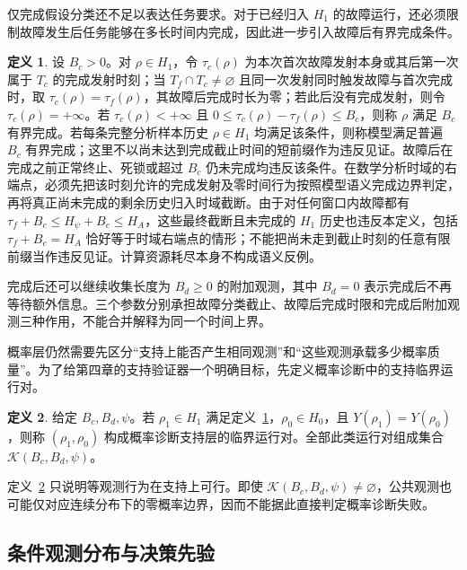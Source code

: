 \documentclass[master,fontset=ubuntu]{shnuthesis}
\theoremstyle{definition}
\newtheorem{thesisdefinition}{定义}
\begin{document}
仅完成假设分类还不足以表达任务要求。对于已经归入 \(H_1\) 的故障运行，还必须限制故障发生后任务能够在多长时间内完成，因此进一步引入故障后有界完成条件。

\begin{thesisdefinition}
\label{def:bounded-postfault-completion}
设 \(B_c>0\)。对 \(\rho\in H_1\)，令 \(\tau_c(\rho)\) 为本次首次故障发射本身或其后第一次属于 \(T_c\) 的完成发射时刻；当 \(T_f\cap T_c\neq\varnothing\) 且同一次发射同时触发故障与首次完成时，取 \(\tau_c(\rho)=\tau_f(\rho)\)，其故障后完成时长为零；若此后没有完成发射，则令 \(\tau_c(\rho)=+\infty\)。若 \(\tau_c(\rho)<+\infty\) 且
\(0\leq\tau_c(\rho)-\tau_f(\rho)\leq B_c\)，则称 \(\rho\) 满足 \(B_c\) 有界完成。若每条完整分析样本历史 \(\rho\in H_1\) 均满足该条件，则称模型满足普遍 \(B_c\) 有界完成；这里不以尚未达到完成截止时间的短前缀作为违反见证。故障后在完成之前正常终止、死锁或超过 \(B_c\) 仍未完成均违反该条件。在数学分析时域的右端点，必须先把该时刻允许的完成发射及零时间行为按照模型语义完成边界判定，再将真正尚未完成的剩余历史归入时域截断。由于对任何窗口内故障都有 \(\tau_f+B_c\leq H_\psi+B_c\leq H_A\)，这些最终截断且未完成的 \(H_1\) 历史也违反本定义，包括 \(\tau_f+B_c=H_A\) 恰好等于时域右端点的情形；不能把尚未走到截止时刻的任意有限前缀当作违反见证。计算资源耗尽本身不构成语义反例。
\end{thesisdefinition}

完成后还可以继续收集长度为 \(B_d\geq0\) 的附加观测，其中 \(B_d=0\) 表示完成后不再等待额外信息。三个参数分别承担故障分类截止、故障后完成时限和完成后附加观测三种作用，不能合并解释为同一个时间上界。

概率层仍然需要先区分“支持上能否产生相同观测”和“这些观测承载多少概率质量”。为了给第四章的支持验证器一个明确目标，先定义概率诊断中的支持临界运行对。

\begin{thesisdefinition}
\label{def:prob-critical-pair}
给定 \(B_c,B_d,\psi\)。若 \(\rho_1\in H_1\) 满足定义~\ref{def:bounded-postfault-completion}，\(\rho_0\in H_0\)，且 \(Y(\rho_1)=Y(\rho_0)\)，则称 \((\rho_1,\rho_0)\) 构成概率诊断支持层的临界运行对。全部此类运行对组成集合 \(\mathcal K(B_c,B_d,\psi)\)。
\end{thesisdefinition}

定义~\ref{def:prob-critical-pair} 只说明等观测行为在支持上可行。即使 \(\mathcal K(B_c,B_d,\psi)\neq\varnothing\)，公共观测也可能仅对应连续分布下的零概率边界，因而不能据此直接判定概率诊断失败。

\subsection{条件观测分布与决策先验}
\end{document}
